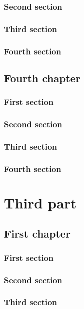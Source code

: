 \documentclass{researchbook}
\begin{document}
\section{Second section}\lipsum
\section{Third section}\lipsum
\section{Fourth section}\lipsum


\chapter{Fourth chapter}

\section{First section}\lipsum
\section{Second section}\lipsum
\section{Third section}\lipsum
\section{Fourth section}\lipsum


\part{Third part}
\chapter{First chapter}

\section{First section}\lipsum
\section{Second section}\lipsum
\section{Third section}\lipsum
\end{document}
